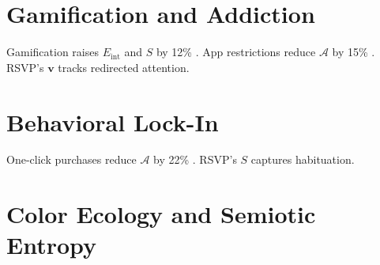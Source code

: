 \documentclass[openany]{book}
\newcommand{\vvec}{\mathbf{v}} %
\newcommand{\Sent}{S} %
\newcommand{\Eint}{E_{\mathrm{int}}} %
\newcommand{\Auton}{\mathcal{A}} %
\begin{document}
\section{Gamification and Addiction}
\label{sec:aesthetic-gamification}
Gamification raises \(\Eint\) and \(\Sent\) by 12\% \citep{colak2024}. App restrictions reduce \(\Auton\) by 15\% \citep{doctorow2022}. RSVP’s \(\vvec\) tracks redirected attention.

\section{Behavioral Lock-In}
\label{sec:aesthetic-lockin}
One-click purchases reduce \(\Auton\) by 22\% \citep{doctorow2022}. RSVP’s \(\Sent\) captures habituation.

\section{Color Ecology and Semiotic Entropy}
\label{sec:color-ecology}
\end{document}
